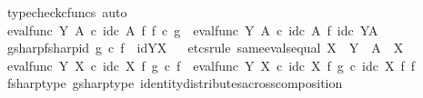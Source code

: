 \begin{isabellebody}
\ {\isacharparenleft}{\kern0pt}typecheck{\isacharunderscore}{\kern0pt}cfuncs{\isacharcomma}{\kern0pt}\ auto{\isacharparenright}{\kern0pt}\isanewline
\ \ \ \ \isamarkupfalse%
\ \isamarkupfalse%
\ {\isachardoublequoteopen}eval{\isacharunderscore}{\kern0pt}func\ Y\ A\ {\isasymcirc}\isactrlsub c\ id\isactrlsub c\ A\ {\isasymtimes}\isactrlsub f\ f\isactrlsup {\isasymsharp}\ {\isasymcirc}\isactrlsub c\ g\isactrlsup {\isasymsharp}\ {\isacharequal}{\kern0pt}\ eval{\isacharunderscore}{\kern0pt}func\ Y\ A\ {\isasymcirc}\isactrlsub c\ id\isactrlsub c\ A\ {\isasymtimes}\isactrlsub f\ id\isactrlsub c\ {\isacharparenleft}{\kern0pt}Y\isactrlbsup A\isactrlesup {\isacharparenright}{\kern0pt}{\isachardoublequoteclose}\isacommand{{\isachardot}{\kern0pt}}\isamarkupfalse%
\isanewline
\ \ \isamarkupfalse%
\isanewline
\isanewline
\ \ \isamarkupfalse%
\ gsharp{\isacharunderscore}{\kern0pt}fsharp{\isacharunderscore}{\kern0pt}id{\isacharcolon}{\kern0pt}\ {\isachardoublequoteopen}g\isactrlsup {\isasymsharp}\ {\isasymcirc}\isactrlsub c\ f\isactrlsup {\isasymsharp}\ {\isacharequal}{\kern0pt}\ id{\isacharparenleft}{\kern0pt}Y\isactrlbsup X\isactrlesup {\isacharparenright}{\kern0pt}{\isachardoublequoteclose}\isanewline
\ \ \isamarkupfalse%
{\isacharparenleft}{\kern0pt}etcs{\isacharunderscore}{\kern0pt}rule\ same{\isacharunderscore}{\kern0pt}evals{\isacharunderscore}{\kern0pt}equal{\isacharbrackleft}{\kern0pt}\ X\ {\isacharequal}{\kern0pt}\ Y{\isacharcomma}{\kern0pt}\ \ A\ {\isacharequal}{\kern0pt}\ X{\isacharbrackright}{\kern0pt}{\isacharparenright}{\kern0pt}\isanewline
\ \ \ \ \isamarkupfalse%
\ {\isachardoublequoteopen}eval{\isacharunderscore}{\kern0pt}func\ Y\ X\ {\isasymcirc}\isactrlsub c\ id\isactrlsub c\ X\ {\isasymtimes}\isactrlsub f\ g\isactrlsup {\isasymsharp}\ {\isasymcirc}\isactrlsub c\ f\isactrlsup {\isasymsharp}\ {\isacharequal}{\kern0pt}\ eval{\isacharunderscore}{\kern0pt}func\ Y\ X\ {\isasymcirc}\isactrlsub c\ {\isacharparenleft}{\kern0pt}id\isactrlsub c\ X\ {\isasymtimes}\isactrlsub f\ g\isactrlsup {\isasymsharp}{\isacharparenright}{\kern0pt}\ {\isasymcirc}\isactrlsub c\ {\isacharparenleft}{\kern0pt}id\isactrlsub c\ X\ {\isasymtimes}\isactrlsub f\ f\isactrlsup {\isasymsharp}{\isacharparenright}{\kern0pt}{\isachardoublequoteclose}\isanewline
\ \ \ \ \ \ \isamarkupfalse%
\ fsharp{\isacharunderscore}{\kern0pt}type\ gsharp{\isacharunderscore}{\kern0pt}type\ identity{\isacharunderscore}{\kern0pt}distributes{\isacharunderscore}{\kern0pt}across{\isacharunderscore}{\kern0pt}composition\ \isamarkupfalse%

\end{isabellebody}
